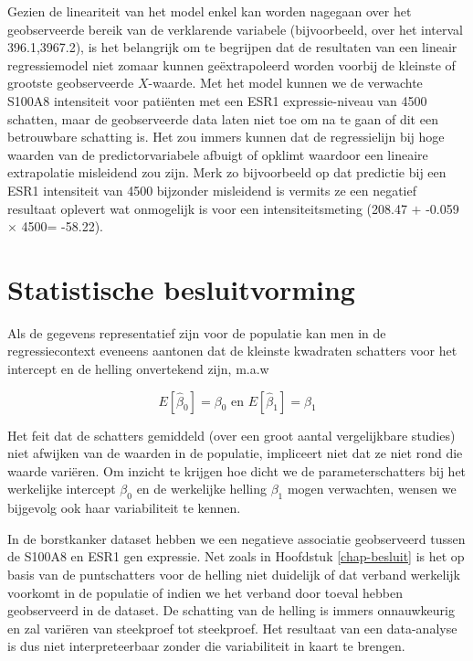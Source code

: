 \documentclass[
  12pt,dutch,coursenotes]{book}
\theoremstyle{definition}
\theoremstyle{definition}
\theoremstyle{definition}
\theoremstyle{definition}
\theoremstyle{remark}
\begin{document}
Gezien de lineariteit van het model enkel kan worden nagegaan over het
geobserveerde bereik van de verklarende variabele (bijvoorbeeld, over het
interval 396.1,3967.2), is het belangrijk om te begrijpen dat de resultaten van een lineair regressiemodel niet zomaar kunnen geëxtrapoleerd worden
voorbij de kleinste of grootste geobserveerde \(X\)-waarde.
Met het model kunnen we de verwachte S100A8 intensiteit voor patiënten met een
ESR1 expressie-niveau van 4500 schatten, maar de geobserveerde data laten niet toe om na te gaan of dit een
betrouwbare schatting is. Het zou immers kunnen dat de regressielijn bij hoge waarden van de predictorvariabele
afbuigt of opklimt waardoor een lineaire extrapolatie misleidend zou zijn.
Merk zo bijvoorbeeld op dat predictie bij een ESR1 intensiteit van 4500 bijzonder misleidend is vermits ze een negatief resultaat oplevert wat onmogelijk is voor een intensiteitsmeting (208.47 \(+\) -0.059 \(\times\) 4500= -58.22).

\hypertarget{sec:linBesluit}{%
\section{Statistische besluitvorming}\label{sec:linBesluit}}

Als de gegevens representatief zijn voor de populatie kan men in de regressiecontext eveneens aantonen dat de kleinste kwadraten schatters voor het intercept en de helling onvertekend zijn, m.a.w

\[E[\hat \beta_0]=\beta_0 \text{ en } E[\hat \beta_1]=\beta_1\]

Het feit dat de schatters gemiddeld (over een groot aantal vergelijkbare studies) niet afwijken van de waarden in de populatie, impliceert niet dat ze niet rond die waarde variëren.
Om inzicht te krijgen hoe dicht we de parameterschatters bij het werkelijke intercept \(\beta_0\) en de werkelijke helling \(\beta_1\) mogen verwachten, wensen we bijgevolg ook haar variabiliteit te kennen.

In de borstkanker dataset hebben we een negatieve associatie geobserveerd tussen de S100A8 en ESR1 gen expressie.
Net zoals in Hoofdstuk \ref{chap-besluit} is het op basis van de puntschatters voor de helling niet duidelijk of dat verband werkelijk voorkomt in de populatie of indien we het verband door toeval hebben geobserveerd in de dataset.
De schatting van de helling is immers onnauwkeurig en zal variëren van steekproef tot steekproef.
Het resultaat van een data-analyse is dus niet interpreteerbaar zonder die variabiliteit in kaart te brengen.
\end{document}
